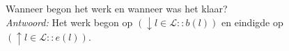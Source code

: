 
\item Wanneer begon het werk en wanneer was het klaar? \\


\emph{Antwoord:} Het werk begon op $(\downarrow l \in \mathcal{L} : : b(l))$ en eindigde op $(\uparrow l \in \mathcal{L} : : e(l))$. \\

